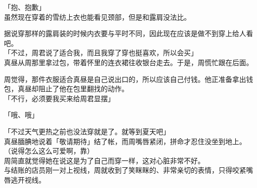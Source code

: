 「抱、抱歉」\\

虽然现在穿着的雪纺上衣也能看见颈部，但是和露肩没法比。

据说穿那样的露肩装的时候内衣要与平时不同，因此现在应该是做不到穿上给人看吧。\\

「不过，周君说了适合我，而且我穿了穿也挺喜欢，所以会买」\\

真昼从周那里拿过包，带着怀里的连衣裙往收银台走去。于是，周慌忙跟在后面。

周觉得，那件衣服适合真昼是自己说出口的，所以应该自己付钱。他正准备拿出钱包，真昼却阻止了他在包里翻找的动作。\\

「不行，必须要我买来给周君显摆」

「哦、哦」

「不过天气更热之前也没法穿就是了。就等到夏天吧」\\

真昼腼腆地说着「敬请期待」结了帐，而周嘴唇紧闭，拼命才忍住没坐到地上。\\

（说得怎么这么可爱啊，靠）\\

周简直就觉得她在说这是为了自己而穿一样，这对心脏非常不好。\\

与结账的店员刚一对上视线，周就收到了笑眯眯的、非常亲切的表情，只得咬紧嘴唇逃开视线。

